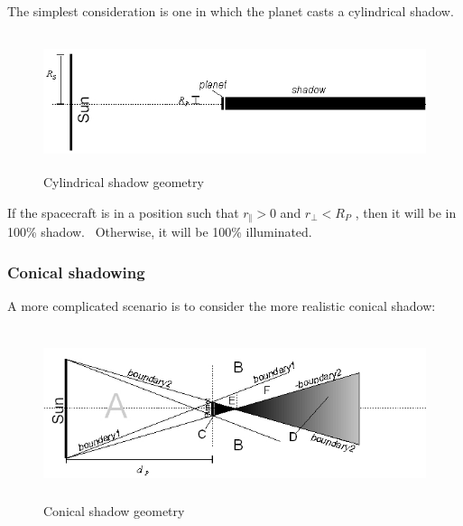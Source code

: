   The simplest consideration is one in which the planet casts a
  cylindrical shadow.

  \begin{figure}[!ht]
    \includegraphics[height=40mm]{figs/shadow/shadow_seeker_fig2.jpg}
    \caption{Cylindrical shadow geometry}
    \label{fig:shadow_seeker2}
  \end{figure}

  \bigskip
  If the spacecraft is in a position such that
  $r_\Vert>0$ and
  $r_\bot<R_{P}$ , then it will be in 100\% shadow.
  \ Otherwise, it will be 100\% illuminated.

  \bigskip

  \clearpage
  \subsubsection{Conical shadowing}\bigskip
  A more complicated scenario is to consider the more realistic conical
  shadow:

  \begin{figure}[!ht]
    \includegraphics[height=50mm]{figs/shadow/shadow_seeker_fig3.jpg}
    \caption{Conical shadow geometry}
    \label{fig:shadow_seeker3}
  \end{figure}

   \bigskip


